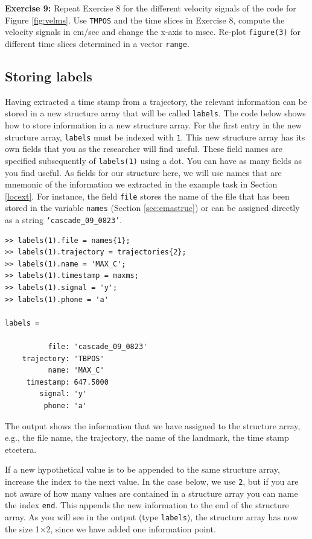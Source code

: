 \documentclass[a4paper, 12pt]{article}
\begin{document}
\noindent\textbf{Exercise 9:} Repeat Exercise 8 for the different velocity signals of the code for Figure \ref{fig:velms}. Use \texttt{TMPOS} and the time slices in Exercise 8, compute the velocity signals in cm/sec and change the x-axis to msec. Re-plot \texttt{figure(3)} for different time slices determined in a vector \texttt{range}.\par\smallskip


\subsection{Storing labels}\label{storlab}

Having extracted a time stamp from a trajectory, the relevant information can be stored in a new structure array that will be called \texttt{labels}. The code below shows how to store information in a new structure array. For the first entry in the new structure array, \texttt{labels} must be indexed with \texttt{1}. This new structure array has its own fields that you as the researcher will find useful. These field names are specified subsequently of \texttt{labels(1)} using a dot. You can have as many fields as you find useful. As fields for our structure here, we will use names that are mnemonic of the information we extracted in the example task in Section \ref{locext}. For instance, the field \texttt{file} stores the name of the file that has been stored in the variable \texttt{names} (Section \ref{sec:emastruc}) or can be assigned directly as a string \texttt{`cascade\_09\_0823'}.

\begin{verbatim}
>> labels(1).file = names{1};
>> labels(1).trajectory = trajectories{2};
>> labels(1).name = 'MAX_C';
>> labels(1).timestamp = maxms;
>> labels(1).signal = 'y';
>> labels(1).phone = 'a'

labels = 

          file: 'cascade_09_0823'
    trajectory: 'TBPOS'
          name: 'MAX_C'
     timestamp: 647.5000
        signal: 'y'
         phone: 'a'
\end{verbatim}
 
The output shows the information that we have assigned to the structure array, e.g., the file name, the trajectory, the name of the landmark, the time stamp etcetera.

If a new hypothetical value is to be appended to the same structure array, increase the index to the next value. In the case below, we use \texttt{2}, but if you are not aware of how many values are contained in a structure array you can name the index \texttt{end}. This appends the new information to the end of the structure array. As you will see in the output (type \texttt{labels}), the structure array has now the size 1$\times$2, since we have added one information point.\par
\end{document}
